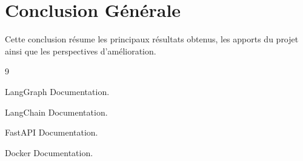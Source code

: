 \documentclass[12pt,a4paper,oneside]{report}
\begin{document}

\chapter*{Conclusion Générale}

Cette conclusion résume les principaux résultats obtenus, les apports du projet ainsi que les perspectives d'amélioration.


\begin{thebibliography}{9}

LangGraph Documentation.

LangChain Documentation.

FastAPI Documentation.

Docker Documentation.

\end{thebibliography}
\end{document}
